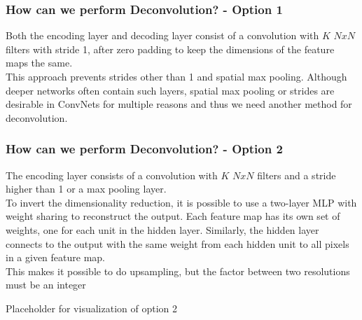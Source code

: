 \documentclass{beamer}
\begin{document}
\begin{frame}
\frametitle{How can we perform Deconvolution? - Option 1}
Both the encoding layer and decoding layer consist of a convolution with $K$ $NxN$ filters with stride 1, after zero padding to keep the dimensions of the feature maps the same. \\ \vspace{4mm}
This approach prevents strides other than 1 and spatial max pooling. Although deeper networks often contain such layers, spatial max pooling or strides are desirable in ConvNets for multiple reasons and thus we need another method for deconvolution.

\end{frame}

\begin{frame}
\frametitle{How can we perform Deconvolution? - Option 2}

The encoding layer consists of a convolution with $K$ $NxN$ filters and a stride higher than 1 or a max pooling layer.
\\ \vspace{4mm}
To invert the dimensionality reduction, it is possible to use a two-layer MLP with weight sharing to reconstruct the output. Each feature map has its own set of weights, one for each unit in the hidden layer. Similarly, the hidden layer connects to the output with the same weight from each hidden unit to all pixels in a given feature map.
\\ \vspace{4mm}
This makes it possible to do upsampling, but the factor between two resolutions must be an integer



\end{frame}

\begin{frame}
Placeholder for visualization of option 2
\end{frame}
\end{document}
